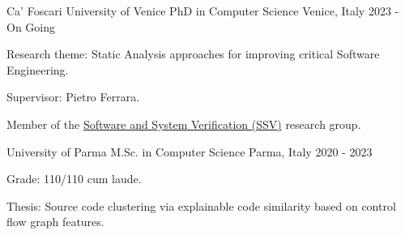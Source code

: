 
\begin{cventries}

  \cventry
    {Ca' Foscari University of Venice} %
    {PhD in Computer Science} %
    {Venice, Italy} %
    {2023 - On Going} %
    {
        \begin{cvitems} %
            \item {Research theme: Static Analysis approaches for improving critical Software Engineering.}
            \item {Supervisor: Pietro Ferrara.}
            \item {Member of the \href{https://unive-ssv.github.io/}{Software and System Verification (SSV)} research group.}
        \end{cvitems}
    }

  \cventry
    {University of Parma} %
    {M.Sc. in Computer Science} %
    {Parma, Italy} %
    {2020 - 2023} %
    {
      \begin{cvitems} %
        \item {Grade: 110/110 cum laude.}
        \item {Thesis: Source code clustering via explainable code similarity based on control flow graph features.}
      \end{cvitems}
    }


\end{cventries}
